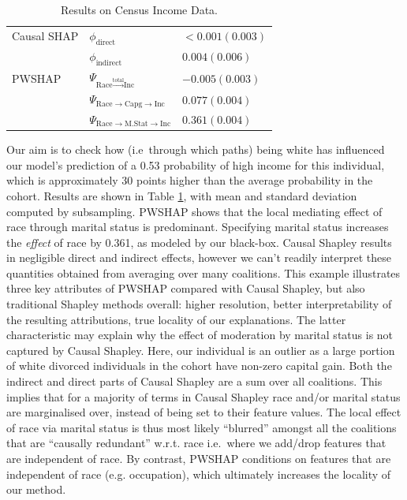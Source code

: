 \documentclass{article}
\theoremstyle{plain}
\theoremstyle{definition}
\theoremstyle{remark}
\newcommand{\effect}{\Psi}
\theoremstyle{mystyle}
\begin{document}
\begin{table}
\centering
  \caption{Results on Census Income Data. %
  }%
\label{tab:results_uci}
\begin{tabular}{lll}
\hline
\footnotesize{Causal SHAP} & \footnotesize{$\phi_{\text{direct}}$}   & \footnotesize{$<0.001  (0.003)$ } \\
            & \footnotesize{$\phi_{\text{indirect}}$}   & \footnotesize{$0.004  (0.006)$} \\ \hline
\footnotesize{PWSHAP}      & \footnotesize{$\effect_{\text{Race} \xrightarrow{\text{total}} \text{Inc}}$}  & \footnotesize{$-0.005  (0.003)$} \\
            & \footnotesize{$\effect_{\text{Race} \rightarrow \text{Capg} \rightarrow \text{Inc}}$} & \footnotesize{$0.077  (0.004)$}   \\
            & \footnotesize{$\effect_{\text{Race} \rightarrow \text{M.Stat} \rightarrow \text{Inc}}$} & \footnotesize{$0.361  (0.004)$}  \\ \hline
\end{tabular}
\vspace*{-0.2cm}
\end{table}
Our aim is to check how (i.e\ through which paths) being white has influenced our model's prediction of a 0.53 probability of high income for this individual, which is approximately 30 points higher than the average probability in the cohort. Results are shown in Table \ref{tab:results_uci}, with mean and standard deviation computed by subsampling. PWSHAP shows that the local mediating effect of race through marital status is predominant. Specifying marital status increases the \emph{effect} of race by 0.361, as modeled by our black-box. Causal Shapley results in negligible direct and indirect effects, however we can't readily interpret these quantities obtained from averaging over many coalitions. This example illustrates three key attributes of PWSHAP compared with Causal Shapley, but also traditional Shapley methods overall: higher resolution, better interpretability of the resulting attributions, true locality of our explanations. The latter characteristic may explain why the effect of moderation by marital status is not captured by Causal Shapley. Here, our individual is an outlier as a large portion of white divorced individuals in the cohort have non-zero capital gain. Both the indirect and direct parts of Causal Shapley are a sum over all coalitions. This implies that for a majority of terms in Causal Shapley race and/or marital status are marginalised over, instead of being set to their feature values. The local effect of race via marital status is thus most likely ``blurred'' amongst all the coalitions that are ``causally redundant'' w.r.t. race i.e.\ where we add/drop features that are independent of race. By contrast, PWSHAP conditions on features that are independent of race (e.g. occupation), which ultimately increases the locality of our method. 
\end{document}
